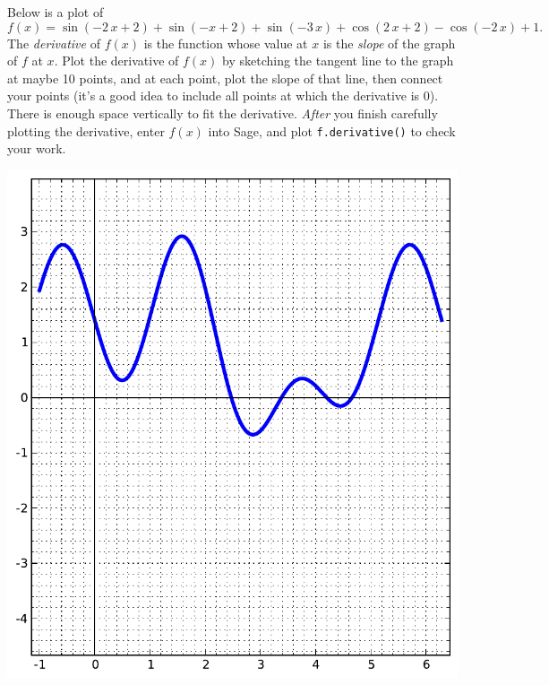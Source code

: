 Below is a plot of $$f(x)=\sin\left(-2 \, x + 2\right) + \sin\left(-x + 2\right) + \sin\left(-3 \, x\right) + \cos\left(2 \, x + 2\right) - \cos\left(-2 \, x\right) + 1.$$  The {\em \color{red}derivative} of $f(x)$ is the function whose value at $x$ is the {\em slope} of the graph of $f$ at $x$.  Plot the derivative of $f(x)$ by sketching the tangent line to the graph at maybe 10 points, and at each point, plot the slope of that line, then connect your points (it's a good idea to include all points at which the derivative is 0).  There is enough space vertically to fit the derivative.  {\em After} you finish carefully plotting the derivative, enter $f(x)$ into Sage, and plot {\color{blue}\verb|f.derivative()|} to check your work.
\begin{center}\includegraphics{functions/16.pdf}\end{center}\newpage

